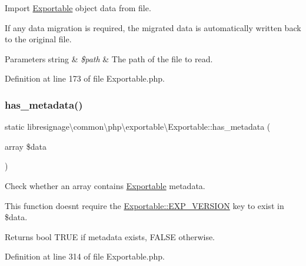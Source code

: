 Import \hyperlink{classlibresignage_1_1common_1_1php_1_1exportable_1_1Exportable}{Exportable} object data from file.

If any data migration is required, the migrated data is automatically written back to the original file.


\begin{DoxyParams}[1]{Parameters}
string & {\em \$path} & The path of the file to read. \\
\hline
\end{DoxyParams}


Definition at line 173 of file Exportable.\+php.

\mbox{\label{classlibresignage_1_1common_1_1php_1_1exportable_1_1Exportable_a21d53151e094979d8de5f84a82a9d837}} 
\subsubsection{\texorpdfstring{has\+\_\+metadata()}{has\_metadata()}}
{\footnotesize\ttfamily static libresignage\textbackslash{}common\textbackslash{}php\textbackslash{}exportable\textbackslash{}\+Exportable\+::has\+\_\+metadata (\begin{DoxyParamCaption}\item[{array}]{\$data }\end{DoxyParamCaption})\hspace{0.3cm}{\ttfamily [static]}}

Check whether an array contains \hyperlink{classlibresignage_1_1common_1_1php_1_1exportable_1_1Exportable}{Exportable} metadata.

This function doesn\textquotesingle{}t require the \hyperlink{classlibresignage_1_1common_1_1php_1_1exportable_1_1Exportable_a90cbc6d34faa2b604818cb123fc1e52c}{Exportable\+::\+E\+X\+P\+\_\+\+V\+E\+R\+S\+I\+ON} key to exist in \$data.

\begin{DoxyReturn}{Returns}
bool T\+R\+UE if metadata exists, F\+A\+L\+SE otherwise. 
\end{DoxyReturn}


Definition at line 314 of file Exportable.\+php.

